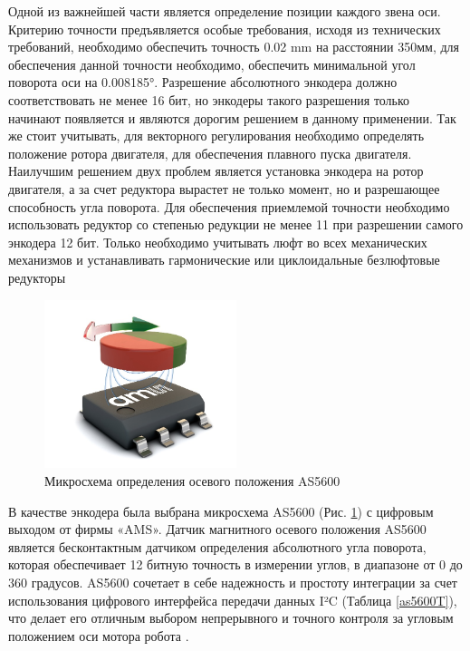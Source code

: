 Одной из важнейшей части является определение позиции каждого звена оси. Критерию точности предъявляется особые требования, исходя из технических требований, необходимо обеспечить точность 0.02 mm на расстоянии 350мм, для обеспечения данной точности необходимо, обеспечить минимальной угол поворота оси на 0.008185°. Разрешение абсолютного энкодера должно соответствовать не менее 16 бит, но энкодеры такого разрешения только начинают появляется и являются дорогим решением в данному применении. Так же стоит учитывать, для векторного регулирования необходимо определять положение ротора двигателя, для обеспечения плавного пуска двигателя. Наилучшим решением двух проблем является установка энкодера на ротор двигателя, а за счет редуктора вырастет не только момент, но и разрешающее способность угла поворота.  Для обеспечения приемлемой точности необходимо использовать редуктор со степенью редукции не менее 11 при разрешении самого энкодера 12 бит. Только необходимо учитывать люфт во всех механических механизмов и устанавливать гармонические или циклоидальные безлюфтовые редукторы \citep{Sensinger2012}


\begin{figure}[H]
	\centering
	\includegraphics[width=0.5\textwidth]{Src/images/as5600.png}
	\caption{ Микросхема определения осевого положения AS5600}
	\label{as5600P}
\end{figure}

В качестве энкодера была выбрана микросхема AS5600 (Рис. \ref{as5600P}) с цифровым выходом от фирмы «AMS». Датчик магнитного осевого положения AS5600 является бесконтактным датчиком определения абсолютного угла поворота, которая обеспечивает 12 битную точность в измерении углов, в диапазоне от 0 до 360 градусов. AS5600 сочетает в себе надежность и простоту интеграции за счет использования цифрового интерфейса передачи данных I²C (Таблица \ref{as5600T}), что делает его отличным выбором непрерывного и точного контроля за угловым положением оси мотора робота \citep{ams}.

